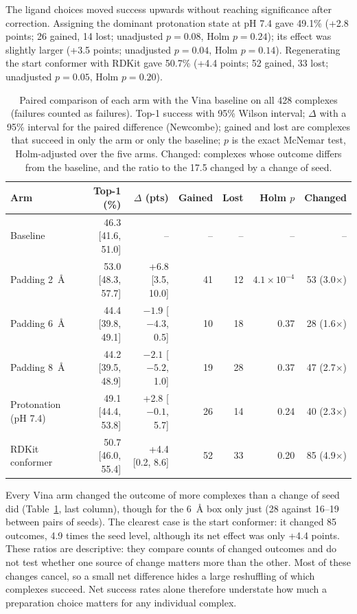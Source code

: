 The ligand choices moved success upwards without reaching significance after correction.
Assigning the dominant protonation state at pH 7.4 gave 49.1\% (+2.8 points; 26 gained, 14
lost; unadjusted $p = 0.08$, Holm $p = 0.24$); its \pbvalid{} effect was slightly larger
(+3.5 points; unadjusted $p = 0.04$, Holm $p = 0.14$). Regenerating the start conformer with
RDKit gave 50.7\% (+4.4 points; 52 gained, 33 lost; unadjusted $p = 0.05$, Holm
$p = 0.20$).

\begin{table}[h]
  \centering
  \caption{Paired comparison of each arm with the Vina baseline on all 428 complexes
    (failures counted as failures). Top-1 success with 95\% Wilson interval; $\Delta$ with
    a 95\% interval for the paired difference (Newcombe); gained and lost
    are complexes that succeed in only the arm or only the baseline; $p$ is the exact
    McNemar test, Holm-adjusted over the five arms. Changed: complexes whose outcome
    differs from the baseline, and the ratio to the 17.5 changed by a change of seed.}
  \label{tab:comparisons}
  \small
  \setlength{\tabcolsep}{4pt}
  \begin{tabular}{lrrrrrr}
    \toprule
    Arm & Top-1 (\%) & $\Delta$ (pts) & Gained & Lost & Holm $p$ & Changed \\
    \midrule
    Baseline & 46.3 [41.6, 51.0] & -- & -- & -- & -- & -- \\
    Padding \SI{2}{\angstrom} & 53.0 [48.3, 57.7] & +6.8 [3.5, 10.0] & 41 & 12 & $4.1\times10^{-4}$
      & 53 (3.0$\times$) \\
    Padding \SI{6}{\angstrom} & 44.4 [39.8, 49.1] & $-1.9$ [$-4.3$, 0.5] & 10 & 18 & 0.37 & 28 (1.6$\times$) \\
    Padding \SI{8}{\angstrom} & 44.2 [39.5, 48.9] & $-2.1$ [$-5.2$, 1.0] & 19 & 28 & 0.37 & 47 (2.7$\times$) \\
    Protonation (pH 7.4) & 49.1 [44.4, 53.8] & +2.8 [$-0.1$, 5.7] & 26 & 14 & 0.24 & 40 (2.3$\times$) \\
    RDKit conformer & 50.7 [46.0, 55.4] & +4.4 [0.2, 8.6] & 52 & 33 & 0.20 & 85 (4.9$\times$) \\
    \bottomrule
  \end{tabular}
\end{table}

Every Vina arm changed the outcome of more complexes than a change of seed did
(Table~\ref{tab:comparisons}, last column), though for the \SI{6}{\angstrom} box only just
(28 against 16--19 between pairs of seeds). The clearest case is the start conformer: it
changed 85 outcomes, 4.9 times the seed level, although its net effect was only +4.4
points. These ratios are descriptive: they compare counts of changed outcomes and do not
test whether one source of change matters more than the other. Most of these changes cancel, so a small net difference hides a large reshuffling of
which complexes succeed. Net success rates alone therefore understate how much a preparation
choice matters for any individual complex.

